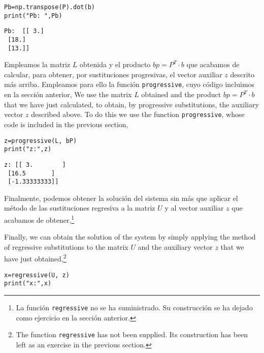 \begin{verbatim}
Pb=np.transpose(P).dot(b)
print("Pb: ",Pb)
\end{verbatim}

\begin{verbatim}
Pb:  [[ 3.]
 [18.]
 [13.]]  
\end{verbatim}

\begin{paracol}{2}

Empleamos la matriz $L$ obtenida y el producto $bp=P^T\cdot b$ que acabamos de calcular, para obtener, por sustituciones progresivas, el vector auxiliar $z$ descrito más arriba. Empleamos para ello la función \texttt{progressive}, cuyo código incluimos en la sección anterior, 
\switchcolumn
We use the matrix $L$ obtained and the product $bp=P^T\cdot b$ that we have just calculated, to obtain, by progressive substitutions, the auxiliary vector $z$ described above. To do this we use the function \texttt{progressive}, whose code is included in the previous section, 
\end{paracol}

\begin{verbatim}
z=progressive(L, bP)
print("z:",z)    
\end{verbatim}

\begin{verbatim}
z: [[ 3.        ]
 [16.5       ]
 [-1.33333333]]  
\end{verbatim}

\begin{paracol}{2}

Finalmente, podemos obtener la solución del sistema sin más que aplicar el método de las sustituciones regresiva a la matriz $U$ y al vector auxiliar $z$ que acabamos de obtener,\footnote{La función \texttt{regressive} no se ha suministrado. Su construcción se ha dejado como ejercicio en la sección anterior.}

\switchcolumn
Finally, we can obtain the solution of the system by simply applying the method of regressive substitutions to the matrix $U$ and the auxiliary vector $z$ that we have just obtained,\footnote{ The function \texttt{regressive} has not been supplied. Its construction has been left as an exercise in the previous section.}
\end{paracol}

\begin{verbatim}
x=regressive(U, z)
print("x:",x)
\end{verbatim}

